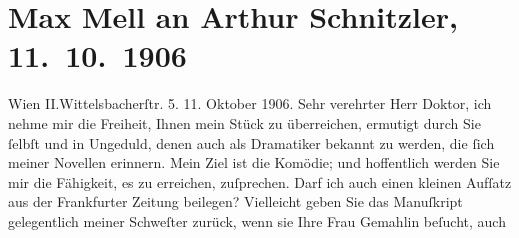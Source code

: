 

         
         \renewcommand{\erwaehntePersonen}{Personen: Josef Kainz, Maria Mell, Olga Schnitzler}
         \renewcommand{\erwaehnteInstitutionen}{Institutionen: Frankfurter Zeitung}
         \renewcommand{\erwaehnteOrte}{Orte: Berlin, II., Leopoldstadt, Wien, Wittelsbachstraße}
         \renewcommand{\erwaehnteWerke}{Werke: Die Komödianten, Über die Briefe Beethovens}
               \section[Max Mell an Arthur Schnitzler, 11. 10. 1906]{ Max Mell an Arthur Schnitzler, 11. 10. 1906}\nopagebreak{}\rehead{ }\begin{ledgroupsized}[t]{13cm}\normalsize\beginnumbering \toendnotes[C]{\smallbreak\pagebreak[2]} 
\toendnotes[C]{\smallbreak}\pstart
           \noindent{}\raggedleft{}{\pb}Wien II.Wittelsbacherſtr. 5.\pend
           \pstart
           \raggedleft{}11. Oktober 1906.\pend
           \pstart{}Sehr verehrter Herr Doktor,\pend\pstart
           ich nehme mir die Freiheit, Ihnen mein Stück zu überreichen, ermutigt durch Sie ſelbſt und in Ungeduld, denen
                    auch als Dramatiker bekannt zu werden, die ſich meiner Novellen erinnern. Mein
                    Ziel ist die Komödie; und hoffentlich werden Sie mir die Fähigkeit, es zu
                    erreichen, zuſprechen.\pend
           \pstart
           Darf ich auch einen kleinen Aufſatz
                    aus der Frankfurter Zeitung beilegen?\pend
           \pstart
           Vielleicht geben Sie das Manuſkript gelegentlich meiner Schweſter zurück, wenn sie Ihre Frau Gemahlin beſucht, auch

\end{ledgroupsized}
